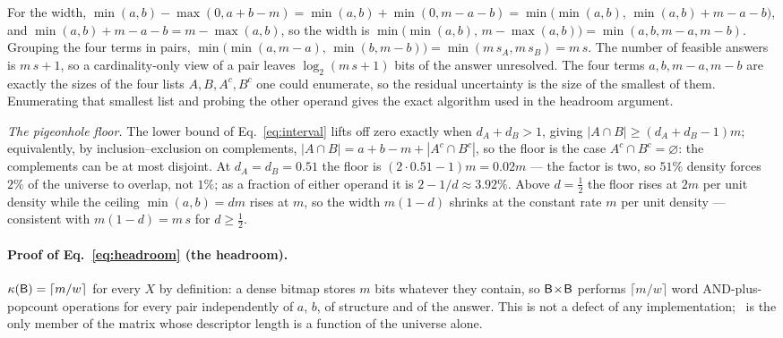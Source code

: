For the width, $\min(a,b)-\max(0,a+b-m)=\min(a,b)+\min(0,m-a-b)=\min\big(\min(a,b),\,\min(a,b)+m-a-b\big)$,
and $\min(a,b)+m-a-b=m-\max(a,b)$, so the width is $\min\big(\min(a,b),\,m-\max(a,b)\big)=\min(a,b,m-a,m-b)$.
Grouping the four terms in pairs, $\min\big(\min(a,m-a),\,\min(b,m-b)\big)=\min(m\,s_A,m\,s_B)=m\,s$.
The number of feasible answers is $m\,s+1$, so a cardinality-only view of a pair leaves
$\log_2(m\,s+1)$ bits of the answer unresolved. The four terms $a,b,m-a,m-b$ are exactly the sizes of
the four lists $A,B,A^c,B^c$ one could enumerate, so the residual uncertainty is the size of the
smallest of them. Enumerating that smallest list and probing the other operand gives the exact
algorithm used in the headroom argument.

\emph{The pigeonhole floor.} The lower bound of Eq.~\eqref{eq:interval} lifts off zero exactly when
$d_A+d_B>1$, giving $|A\cap B|\ge(d_A+d_B-1)m$; equivalently, by inclusion--exclusion on complements,
$|A\cap B|=a+b-m+|A^c\cap B^c|$, so the floor is the case $A^c\cap B^c=\varnothing$: the complements
can be at most disjoint. At $d_A=d_B=0.51$ the floor is $(2\cdot0.51-1)m=0.02m$ --- the factor is two,
so $51\%$ density forces $2\%$ of the universe to overlap, not $1\%$; as a fraction of either operand
it is $2-1/d\approx3.92\%$. Above $d=\tfrac12$ the floor rises at $2m$ per unit density while the
ceiling $\min(a,b)=dm$ rises at $m$, so the width $m(1-d)$ shrinks at the constant rate $m$ per unit
density --- consistent with $m(1-d)=m\,s$ for $d\ge\tfrac12$.

\paragraph*{Proof of Eq.~\eqref{eq:headroom} (the headroom).}
$\kappa(\textsf{B})=\lceil m/w\rceil$ for every $X$ by definition: a dense bitmap stores $m$ bits whatever
they contain, so $\textsf{B}\!\times\!\textsf{B}$ performs $\lceil m/w\rceil$ word AND-plus-popcount operations for
every pair independently of $a$, $b$, of structure and of the answer. This is not a defect of any
implementation; \rB\ is the only member of the matrix whose descriptor length is a function of the
universe alone.

